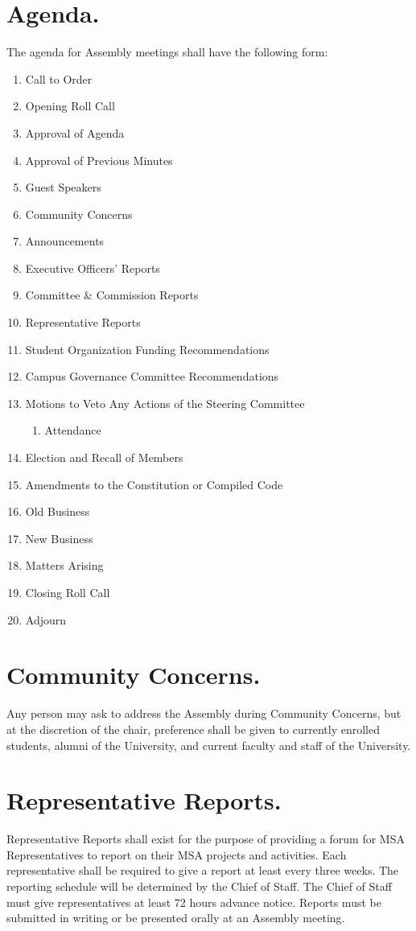 \documentclass{rules}
\begin{document}
\section{Agenda.}
The agenda for Assembly meetings shall have the following form:
\begin{enumerate}
\item Call to Order
\item Opening Roll Call
\item Approval of Agenda
\item Approval of Previous Minutes
\item Guest Speakers
\item Community Concerns
\item Announcements
\item Executive Officers' Reports
\item Committee \& Commission Reports
\item Representative Reports
\item Student Organization Funding Recommendations
\item Campus Governance Committee Recommendations
\item Motions to Veto Any Actions of the Steering Committee
\begin{enumerate}
	\item Attendance
\end{enumerate}
\item Election and Recall of Members
\item Amendments to the Constitution or Compiled Code
\item Old Business
\item New Business
\item Matters Arising
\item Closing Roll Call
\item Adjourn
\end{enumerate}

\section{Community Concerns.}
Any person may ask to address the Assembly during Community Concerns, but at the discretion of the chair, preference shall be given to currently enrolled students, alumni of the University, and current faculty and staff of the University.

\section{Representative Reports.}
Representative Reports shall exist for the purpose of providing a forum for MSA Representatives to report on their MSA projects and activities.  Each representative shall be required to give a report at least every three weeks.  The reporting schedule will be determined by the Chief of Staff.  The Chief of Staff must give representatives at least 72 hours advance notice.  Reports must be submitted in writing or be presented orally at an Assembly meeting. 
\end{document}
